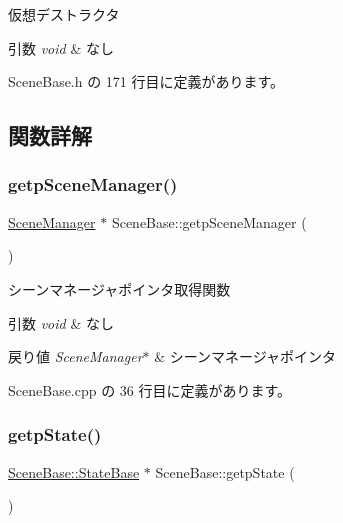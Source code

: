 仮想デストラクタ 


\begin{DoxyParams}{引数}
{\em void} & なし \\
\hline
\end{DoxyParams}


 Scene\+Base.\+h の 171 行目に定義があります。



\subsection{関数詳解}
\mbox{\label{class_scene_base_a4c0b75d2f7ead08828f1e5064aa99720}} 
\subsubsection{\texorpdfstring{getp\+Scene\+Manager()}{getpSceneManager()}}
{\footnotesize\ttfamily \mbox{\hyperlink{class_scene_manager}{Scene\+Manager}} $\ast$ Scene\+Base\+::getp\+Scene\+Manager (\begin{DoxyParamCaption}{ }\end{DoxyParamCaption})}



シーンマネージャポインタ取得関数 


\begin{DoxyParams}{引数}
{\em void} & なし \\
\hline
\end{DoxyParams}

\begin{DoxyRetVals}{戻り値}
{\em Scene\+Manager$\ast$} & シーンマネージャポインタ \\
\hline
\end{DoxyRetVals}


 Scene\+Base.\+cpp の 36 行目に定義があります。

\mbox{\label{class_scene_base_acfea243cbece18d596f2dacad19a345c}} 
\subsubsection{\texorpdfstring{getp\+State()}{getpState()}}
{\footnotesize\ttfamily \mbox{\hyperlink{class_scene_base_1_1_state_base}{Scene\+Base\+::\+State\+Base}} $\ast$ Scene\+Base\+::getp\+State (\begin{DoxyParamCaption}{ }\end{DoxyParamCaption})}



